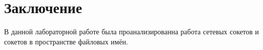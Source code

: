 \chapter{Заключение}

В данной лабораторной работе была проанализированна работа сетевых сокетов и сокетов в пространстве файловых имён.
